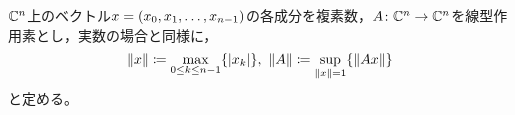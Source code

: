 \documentclass[b5paper,draft]{ltjsbook}
\begin{document}
\ifdraft{\tableofcontents}{}
\begin{defi}
    $\mathbb{C}^n$上のベクトル$x=\pare{x_0,x_1,\dots,x_{n-1}}$の各成分を複素数，$A\colon\mathbb{C}^n\to\mathbb{C}^n$を線型作用素とし，実数の場合と同様に，
    \begin{equation}
        \norm{x}\coloneqq \max_{0\leq k\leq n-1}\bra{\abs{x_k}},\
        \norm{A}\coloneqq \sup_{\norm{x}=1}\bra{\norm{Ax}}
    \end{equation}
    と定める。
\end{defi}
\end{document}
